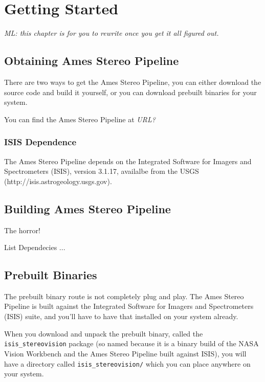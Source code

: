 \chapter{Getting Started}

\emph{ML: this chapter is for you to rewrite once you get it all figured out.}

\section{Obtaining Ames Stereo Pipeline}


There are two ways to get the Ames Stereo Pipeline, you can either
download the source code and build it yourself, or you can download
prebuilt binaries for your system.

You can find the Ames Stereo Pipeline at \emph{URL?}

\subsection*{ISIS Dependence}

The Ames Stereo Pipeline depends on the Integrated Software for Imagers and Spectrometers (ISIS), version 3.1.17, availalbe from the USGS (http://isis.astrogeology.usgs.gov).  

\section{Building Ames Stereo Pipeline}

The horror!

List Dependecies ...


\section{Prebuilt Binaries}

The prebuilt binary route is not completely plug and play.  The
Ames Stereo Pipeline is built against the Integrated Software for
Imagers and Spectrometers (ISIS) suite, and you'll have to have
that installed on your system already.

When you download and unpack the prebuilt binary, called the
\texttt{isis\_stereovision} package (so named because it is a binary
build of the NASA Vision Workbench and the Ames Stereo Pipeline
built against ISIS), you will have a directory called
\texttt{isis\_stereovision/} which you can place anywhere on your
system.

